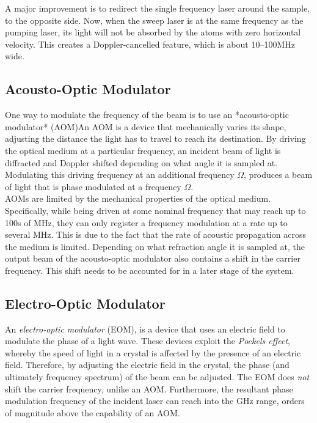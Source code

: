 A major improvement is to redirect the single frequency laser around the sample, to the opposite side.  Now, when the sweep laser is at the same frequency as the pumping laser, its light will not be absorbed by the atoms with zero horizontal velocity.  This creates a Doppler-cancelled feature, which is about 10--100MHz wide.

\subsection{Acousto-Optic Modulator}

One way to modulate the frequency of the beam is to use an *acousto-optic modulator* (AOM)An AOM is a device that mechanically varies its shape, adjusting the distance the light has to travel to reach its destination.  By driving the optical medium at a particular frequency, an incident beam of light is diffracted and Doppler shifted depending on what angle it is sampled at. Modulating this driving frequency at an additional frequency $\Omega$, produces a beam of light that is phase modulated at a frequency $\Omega$. \\

AOMs are limited by the mechanical properties of the optical medium. Specifically, while
being driven at some nominal frequency that may reach up to 100s of MHz, they can only register a frequency modulation at a rate up to several MHz. This is due to the fact that the rate of acoustic propagation across the medium is limited. Depending on what refraction angle it is sampled at, the output beam of the acousto-optic modulator also contains a shift in the carrier frequency.  This shift needs to be accounted for in a later stage of the system.

\subsection{Electro-Optic Modulator}

An \emph{electro-optic modulator} (EOM), is a device that uses an electric field to modulate the phase of a light wave.  These devices exploit the \emph{Pockels effect}, whereby the speed of light in a crystal is affected by the presence of an electric field.  Therefore, by adjusting the electric field in the crystal, the phase (and ultimately frequency spectrum) of the beam can be adjusted.  The EOM does \emph{not} shift the carrier frequency, unlike an AOM. Furthermore, the resultant phase modulation frequency
of the incident laser can reach into the GHz range, orders of magnitude above the
capability of an AOM.\\

